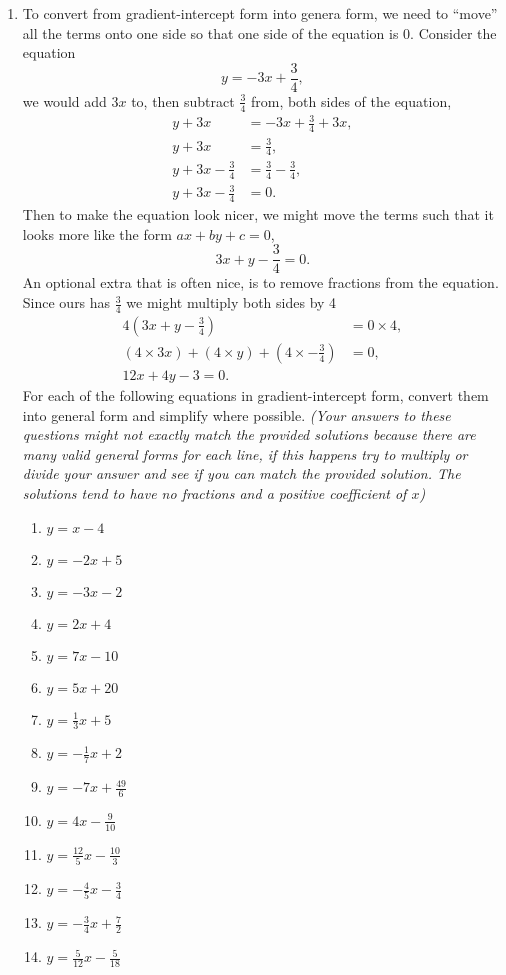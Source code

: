 \documentclass[a4paper,12pt]{article}
\begin{document}
\begin{enumerate}
\item To convert from gradient-intercept form into genera
form, we need to ``move'' all the terms onto one side so
that one side of the equation is 0. Consider the equation 
$$y = -3x + \frac{3}{4},$$
we would add $3x$ to, then subtract $\frac{3}{4}$ from, 
both sides of the equation,
\begin{align*}
y + 3x &= -3x + \frac{3}{4} + 3x, \\
y + 3x &= \frac{3}{4}, \\
y + 3x - \frac{3}{4} &= \frac{3}{4} - \frac{3}{4}, \\
y + 3x - \frac{3}{4} &= 0.
\end{align*}
Then to make the equation look nicer, we might move the terms
such that it looks more like the form $ax + by + c = 0$,
$$3x + y - \frac{3}{4} = 0.$$
An optional extra that is often nice, is to remove fractions 
from the equation. Since ours has $\frac{3}{4}$ we might 
multiply both sides by 4
\begin{align*}
4\left(3x + y - \frac{3}{4}\right) &= 0\times 4, \\
(4 \times 3x) + (4 \times y) + \left(4 \times -\frac{3}{4}\right) &= 0, \\
12x + 4y - 3 = 0.
\end{align*}
For each of the following equations in gradient-intercept form, 
convert them into general form and simplify where possible.
\emph{(Your answers to these questions might not exactly match the 
provided solutions because there are many valid general forms
for each line, if this happens try to multiply or divide your
answer and see if you can match the provided solution. The 
solutions tend to have no fractions and a positive coefficient of
$x$)}
    \begin{multicols}{2}
    \begin{enumerate}
    \item $y = x - 4$
    \item $y = -2x + 5$
    \item $y = -3x - 2$
    \item $y = 2x + 4$
    \item $y = 7x - 10$
    \item $y = 5x + 20$
    \item $y = \frac{1}{3}x + 5$
    \item $y = -\frac{1}{7}x + 2$
    \item $y = -7x + \frac{49}{6}$
    \item $y = 4x - \frac{9}{10}$
    \item $y = \frac{12}{5}x - \frac{10}{3}$
    \item $y = -\frac{4}{5}x - \frac{3}{4}$
    \item $y = -\frac{3}{4}x + \frac{7}{2}$
    \item $y = \frac{5}{12}x - \frac{5}{18}$
    \end{enumerate}
    \end{multicols}

\end{enumerate}
\end{document}
